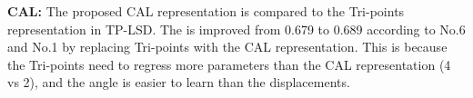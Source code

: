 \documentclass[10pt,twocolumn,letterpaper]{article}
\begin{document}
\textbf{CAL:} The proposed CAL representation is compared to the Tri-points representation in TP-LSD. The  is improved from 0.679 to 0.689 according to No.6 and No.1 by replacing Tri-points with the CAL representation. This is because the Tri-points need to regress more parameters than the CAL representation (4 vs 2), and the angle is easier to learn than the displacements.

\begin{table}[]
\begin{center}
\end{center}
\caption{Ablation study of ELSD. See text for details.}
\label{ablation study}
\end{table}
\end{document}
